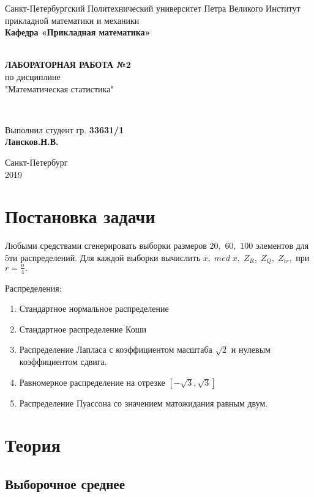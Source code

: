 \documentclass[12pt]{article}
\renewcommand{\listoffigures}{\begingroup  %
\tocsection
\tocfile{\listfigurename}{lof}
\endgroup}
\renewcommand{\listoftables}{\begingroup  %
\tocsection
\tocfile{\listtablename}{lot}
\endgroup}
\begin{document}
\begin{titlepage}
	\center
		Санкт-Петербургский Политехнический 
		университет Петра Великого
		Институт прикладной математики и механики
		\\ \textbf{Кафедра «Прикладная математика»}

	\vfill ~
	\textbf{
		\\ \large ЛАБОРАТОРНАЯ РАБОТА №2
	}
	\\	по дисциплине 
	\\	"Математическая статистика"

	\vfill ~

	Выполнил студент гр. \textbf{33631/1} \\
	\textbf{Лансков.Н.В.} \\ 

\vfill

{\large}	Санкт-Петербург
\\ 2019
\end{titlepage}


\tableofcontents 
\newpage
\listoftables
\newpage

\section{Постановка задачи}
Любыми средствами сгенерировать выборки размеров $20,$ $60,$ $100$ элементов для $5$ти распределений. Для каждой выборки вычислить $\overline{x},\; med\; x,\; Z_R,\; Z_Q,\; Z_{tr},$ при $r = \frac{n}{4}.$

Распределения:
\begin{enumerate}
\item Стандартное нормальное распределение
\item Стандартное распределение Коши
\item Распределение Лапласа с коэффициентом масштаба $\sqrt{2}$ и нулевым коэффициентом сдвига.
\item Равномерное распределение на отрезке $\left[-\sqrt{3}, \sqrt{3}\right]$
\item Распределение Пуассона со значением матожидания равным двум.
\end{enumerate}

\section{Теория}

\subsection{Выборочное среднее \cite{average}}
\end{document}

